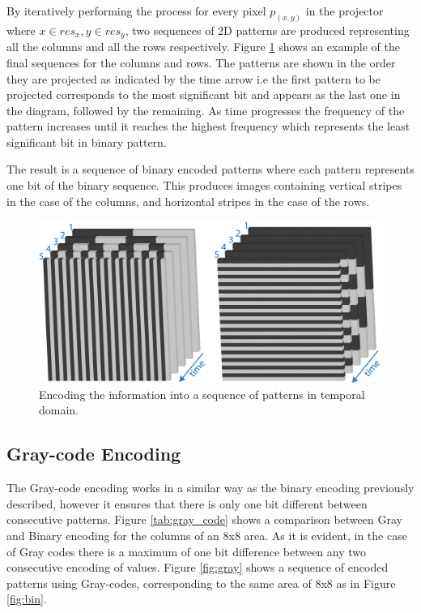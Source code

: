 \documentclass[final,12pt,3p]{elsarticle}
\begin{document}
By iteratively performing the process for every pixel $p_{(x,y)}$ in the projector where $x \in res_{x}, y \in res_{y}$, two sequences of 2D patterns are produced representing all the columns and all the rows respectively. Figure \ref{fig:pattern_encoding} shows an example of the final sequences for the columns and rows. The patterns are shown in the order they are projected as indicated by the time arrow i.e the first pattern to be projected corresponds to the most significant bit and appears as the last one in the diagram, followed by the remaining. As time progresses the frequency of the pattern increases until it reaches the highest frequency which represents the least significant bit in binary pattern.

The result is a sequence of binary encoded patterns where each pattern represents one bit of the binary sequence. This produces images containing vertical stripes in the case of the columns, and horizontal stripes in the case of the rows. 

\begin{figure}[!ht]
 \centering
 \includegraphics[scale=0.5]{./32x32binSeq.png}
 \caption{\label{fig:pattern_encoding} Encoding the information into a sequence of patterns in temporal domain.}
\end{figure}

\subsection{Gray-code Encoding}
The Gray-code encoding works in a similar way as the binary encoding previously described, however it ensures that there is only one bit different between consecutive patterns. Figure \ref{tab:gray_code} shows a comparison between Gray and Binary encoding for the columns of an 8x8 area. As it is evident, in the case of Gray codes there is a maximum of one bit difference between any two consecutive encoding of values. Figure \ref{fig:gray} shows a sequence of encoded patterns using Gray-codes, corresponding to the same area of 8x8 as in Figure \ref{fig:bin}.
\end{document}
